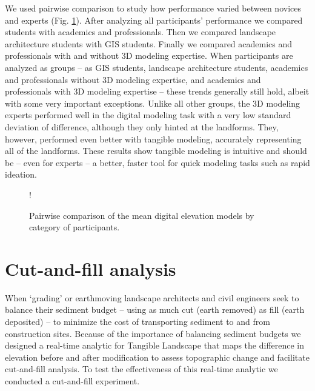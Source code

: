 \documentclass[Afour,sagev,times]{sagej} %
\begin{document}
We used pairwise comparison to study 
how performance varied between 
novices and experts (Fig. \ref{fig:comparison}).
After analyzing all participants' performance
we compared students with academics and professionals. 
Then we compared landscape architecture students with GIS students.
Finally we compared academics and professionals 
with and without 3D modeling expertise.
%
When participants are analyzed as groups 
-- as GIS students, landscape architecture students, 
academics and professionals without 3D modeling expertise, 
and academics and professionals with 3D modeling expertise -- 
these trends generally still hold, 
albeit with some very important exceptions.
%
Unlike all other groups, 
the 3D modeling experts performed well 
in the digital modeling task
with a very low standard deviation of difference, 
although they only hinted at the landforms. 
They, however, performed even better with tangible modeling,
accurately representing all of the landforms. 
%
%
These results show 
tangible modeling is intuitive 
and should be -- even for experts -- 
a better, faster tool 
for quick modeling tasks such as rapid ideation.

\begin{figure}[t]
\resizebox {\textwidth} {!} {}
\caption{Pairwise comparison of the mean digital elevation models 
by category of participants.}
\label{fig:comparison}
\end{figure}



\section{Cut-and-fill analysis}
When `grading' or earthmoving
landscape architects and civil engineers
seek to balance their sediment budget 
-- using as much cut (earth removed) 
as fill (earth deposited) --
to minimize the cost of transporting sediment 
to and from construction sites.
Because of the importance 
of balancing sediment budgets
we designed a real-time analytic 
for Tangible Landscape that 
maps the difference in elevation
before and after modification
to assess topographic change and
facilitate cut-and-fill analysis. 
To test the effectiveness of this real-time analytic
we conducted a cut-and-fill experiment.
\end{document}
